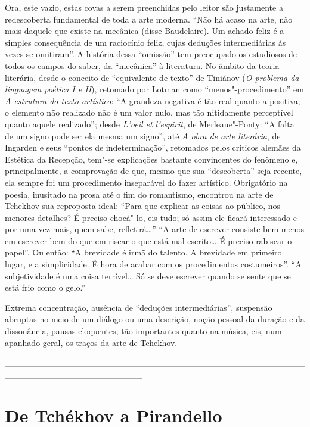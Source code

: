 Ora, este vazio, estas covas a serem preenchidas pelo leitor são
justamente a redescoberta fundamental de toda a arte moderna. ``Não há
acaso na arte, não mais daquele que existe na mecânica (disse
Baudelaire). Um achado feliz é a simples consequência de um raciocínio
feliz, cujas deduções intermediárias às vezes se omitiram''. A história
dessa ``omissão'' tem preocupado os estudiosos de todos os campos do
saber, da ``mecânica'' à literatura. No âmbito da teoria literária,
desde o conceito de ``equivalente de texto'' de Tiniánov (\emph{O
problema da linguagem poética I e II}), retomado por Lotman como
``menos"-procedimento'' em \emph{A estrutura do texto artístico}: ``A
grandeza negativa é tão real quanto a positiva; o elemento não realizado
não é um valor nulo, mas tão nitidamente perceptível quanto aquele
realizado''; desde \emph{L'oeil et l'espirit}, de Merleaue"-Ponty: ``A
falta de um signo pode ser ela mesma um signo'', até \emph{A obra de
arte literária}, de Ingarden e seus ``pontos de indeterminação'',
retomados pelos críticos alemães da Estética da Recepção, tem"-se
explicações bastante convincentes do fenômeno e, principalmente, a
comprovação de que, mesmo que sua ``descoberta'' seja recente, ela
sempre foi um procedimento inseparável do fazer artístico. Obrigatório
na poesia, inusitado na prosa até o fim do romantismo, encontrou na arte
de Tchekhov sua reproposta ideal: ``Para que explicar as coisas ao
público, nos menores detalhes? É preciso chocá"-lo, eis tudo; só assim
ele ficará interessado e por uma vez mais, quem sabe, refletirá\ldots{}'' ``A
arte de escrever consiste bem menos em escrever bem do que em riscar o
que está mal escrito\ldots{} É preciso rabiscar o papel''. Ou então: ``A
brevidade é irmã do talento. A brevidade em primeiro lugar, e a
simplicidade. É hora de acabar com os procedimentos costumeiros''. ``A
subjetividade é uma coisa terrível\ldots{} Só se deve escrever quando se
sente que se está frio como o gelo.''

Extrema concentração, ausência de ``deduções intermediárias'', suspensão
abruptas no meio de um diálogo ou uma descrição, noção pessoal da
duração e da dissonância, pausas eloquentes, tão importantes quanto na
música, eis, num apanhado geral, os traços da arte de Tchekhov.

\_\_\_\_\_\_\_\_\_\_\_\_\_\_\_\_\_\_\_\_\_\_\_\_\_\_\_\_\_\_\_\_\_\_\_\_\_\_\_\_\_\_\_\_\_\_\_\_\_\_\_\_\_\_\_\_\_\_\_\_\_\_\_\_\_\_\_\_\_\_

\chapter{De Tchékhov a Pirandello}

